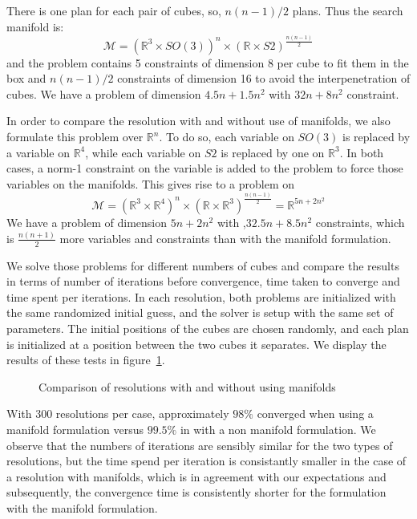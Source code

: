 There is one plan for each pair of cubes, so, $n(n-1)/2$ plans.
Thus the search manifold is:
\begin{equation}
  \mathcal{M} = {\left( \mathbb{R}^3\times SO(3) \right)}^n \times {\left( \mathbb{R} \times S2 \right)}^{\frac{n(n-1)}{2}} \nonumber
\end{equation}
and the problem contains 5 constraints of dimension 8 per cube to fit them in the box and $n(n-1)/2$ constraints of dimension 16 to avoid the interpenetration of cubes.
We have a problem of dimension $4.5n+1.5n^2$ with $32n+8n^2$ constraint.

In order to compare the resolution with and without use of manifolds, we also formulate this problem over $\mathbb{R}^n$.
To do so, each variable on $SO(3)$ is replaced by a variable on $\mathbb{R}^4$, while each variable on $S2$ is replaced by one on $\mathbb{R}^3$.
In both cases, a norm-1 constraint on the variable is added to the problem to force those variables on the manifolds.
This gives rise to a problem on
\begin{equation}
  \mathcal{M}={\left( \mathbb{R}^3\times \mathbb{R}^4 \right)}^n \times {\left( \mathbb{R} \times \mathbb{R}^3 \right)}^{\frac{n(n-1)}{2}} = \mathbb{R}^{5n+2n^2} \nonumber
\end{equation}
We have a problem of dimension $5n+2n^2$ with ,$32.5n+8.5n^2$ constraints, which is $\frac{n(n+1)}{2}$ more variables and constraints than with the manifold formulation.

We solve those problems for different numbers of cubes and compare the results in terms of number of iterations before convergence, time taken to converge and time spent per iterations.
In each resolution, both problems are initialized with the same randomized initial guess, and the solver is setup with the same set of parameters.
The initial positions of the cubes are chosen randomly, and each plan is initialized at a position between the two cubes it separates.
We display the results of these tests in figure~\ref{fig:timings-cubes}.

\begin{figure}[htpb]
  \centering
  
  \caption{Comparison of resolutions with and without using manifolds}
\label{fig:timings-cubes}
\end{figure}

With 300 resolutions per case, approximately $98\%$ converged when using a manifold formulation versus $99.5\%$ in with a non manifold formulation.
We observe that the numbers of iterations are sensibly similar for the two types of resolutions, but the time spend per iteration is consistantly smaller in the case of a resolution with manifolds, which is in agreement with our expectations and subsequently, the convergence time is consistently shorter for the formulation with the manifold formulation.

